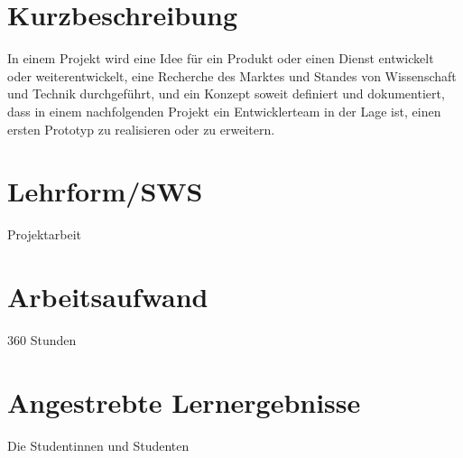 \section*{Kurzbeschreibung\label{/mi-2017/modulbeschreibungen-master/MA_Modul_Projekt_Vision&Konzept}}\label{kurzbeschreibungpathlabelmi-2017modulbeschreibungen-mastermaux5fmodulux5fprojektux5fvisionkonzept}

In einem Projekt wird eine Idee für ein Produkt oder einen Dienst
entwickelt oder weiterentwickelt, eine Recherche des Marktes und Standes
von Wissenschaft und Technik durchgeführt, und ein Konzept soweit
definiert und dokumentiert, dass in einem nachfolgenden Projekt ein
Entwicklerteam in der Lage ist, einen ersten Prototyp zu realisieren
oder zu erweitern.

\section*{Lehrform/SWS\label{/mi-2017/modulbeschreibungen-master/MA_Modul_Projekt_Vision&Konzept}}\label{lehrformswspathlabelmi-2017modulbeschreibungen-mastermaux5fmodulux5fprojektux5fvisionkonzept}

Projektarbeit

\section*{Arbeitsaufwand\label{/mi-2017/modulbeschreibungen-master/MA_Modul_Projekt_Vision&Konzept}}\label{arbeitsaufwandpathlabelmi-2017modulbeschreibungen-mastermaux5fmodulux5fprojektux5fvisionkonzept}

360 Stunden

\section*{Angestrebte
Lernergebnisse\label{/mi-2017/modulbeschreibungen-master/MA_Modul_Projekt_Vision&Konzept}}\label{angestrebte-lernergebnissepathlabelmi-2017modulbeschreibungen-mastermaux5fmodulux5fprojektux5fvisionkonzept}

Die Studentinnen und Studenten

